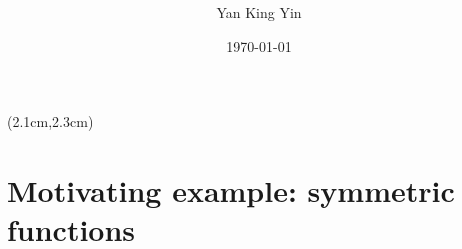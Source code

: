 \newcommand{\logic}[1]{{\color{violet}{\textit{#1}}}}
\newcommand{\underconst}{\texttt{[image: ../2020/UnderConst.png]}}
\newcommand{\KBsymbol}{\vcenter{\hbox{\texttt{[image: ../KB-symbol.png]}}}}
\newcommand{\token}{\vcenter{\hbox{\texttt{[image: token.png]}}}}
\newcommand{\proposition}{\vcenter{\hbox{\texttt{[image: proposition.png]}}}}



\begin{preview}

\title{\vspace{-1.5cm} \bfseries{}}

\author{Yan King Yin} %
\date{\today} %

\maketitle

\setcounter{section}{-1}
\setcounter{mypage}{0}

\begin{textblock*}{5cm}(2.1cm,2.3cm) %
{\color{red}{\large \textcircled{\small \themypage}}}
\addtocounter{mypage}{1}
\end{textblock*}

\begin{minipage}{\textwidth}
\setlength{\parskip}{0.4\baselineskip}

\section{Motivating example: symmetric functions}


\end{minipage}
\end{preview}
